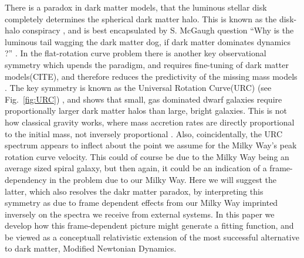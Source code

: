 \documentclass[reprint,%
 amsmath,amssymb,
 aps,
]{revtex4-1}
\begin{document}
There is  a   paradox in dark matter models, that  the luminous stellar   disk completely determines the spherical dark matter halo. This is known as the  disk-halo conspiracy \cite{2004ApJ...609..652M}, and is best encapsulated by   S. McGaugh  question   ``Why is the luminous tail wagging the dark matter dog,  if dark matter dominates dynamics ?'' \cite{1999McGaugh,McGaugh2016RAR}. 
In the flat-rotation curve  problem there is another  key observational symmetry  which upends the paradigm, and requires fine-tuning of dark matter models(CITE), and therefore reduces the predictivity of the missing mass models  \cite{MCGAUGH2021220}. The key symmetry is known as  the Universal Rotation Curve(URC)   (see Fig.~\ref{fig:URC}) \cite{salucci,Persic,1978Rubin,10.1111/j.1365-2966.2007.11696.x}, and shows that small, gas dominated dwarf galaxies require   proportionally larger dark matter halos than   large,  bright  galaxies.  
     This is not how classical gravity works, 
      where    mass accretion rates are directly proportional to the initial mass, not inversely proportional \cite{10.1093/mnras/stt2403}.   Also, coincidentally,  the URC spectrum appears to inflect  about  the point we assume for  the Milky Way's peak  rotation curve velocity. This could of course be due to the Milky Way being an average sized spiral galaxy, but then again, it could be an indication of a frame-dependency in the problem due to our Milky Way. Here we will
    suggest the latter, which also  resolves the dakr matter paradox,   by   interpreting this symmetry as due to frame dependent effects from our Milky Way imprinted inversely on the spectra we receive from external systems. In this paper we 
       develop  how this frame-dependent picture might generate a fitting function, and be viewed as a conceptuall relativistic extension of the most successful alternative to dark matter, Modified Newtonian Dynamics.   

 
 
  
    
\end{document}
